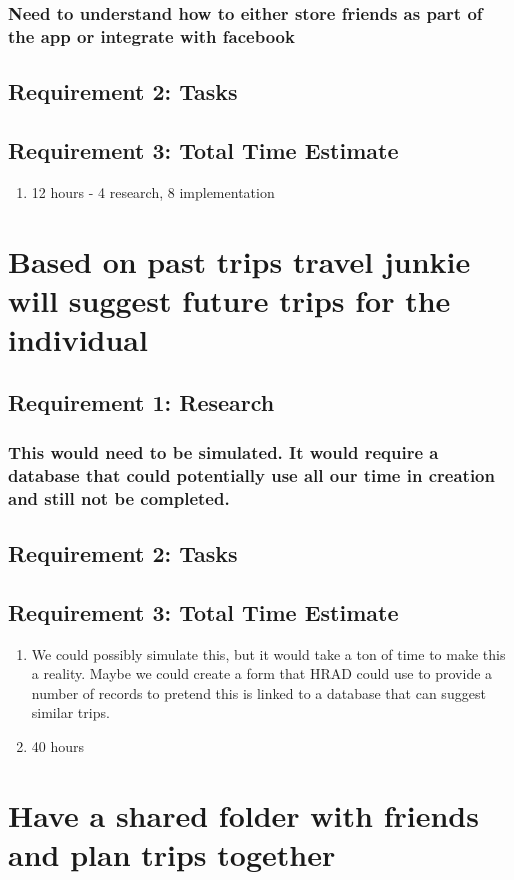 \documentclass [10pt] {article}
\begin{document}
\subsubsection{Need to understand how to either store friends as part of the app or integrate with facebook}
\subsection{Requirement 2: Tasks}
\subsection{Requirement 3: Total Time Estimate}
\begin{enumerate}
\item 12 hours - 4 research, 8 implementation
\end{enumerate}

\section{Based on past trips travel junkie will suggest future trips for the individual}
\subsection{Requirement 1: Research}
\subsubsection{This would need to be simulated.  It would require a database that could potentially use all our time in creation and still not be completed.}
\subsection{Requirement 2: Tasks}
\subsection{Requirement 3: Total Time Estimate}
\begin{enumerate}
\item We could possibly simulate this, but it would take a ton of time to make this a reality.  Maybe we could create a form that HRAD could use to provide a number of records to pretend this is linked to a database that can suggest similar trips.
\item 40 hours
\end{enumerate}


\section{Have a shared folder with friends and plan trips together}
\end{document}
